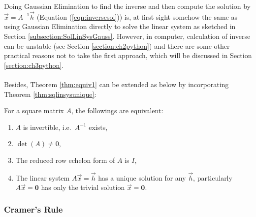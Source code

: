 Doing Gaussian Elimination to find the inverse and then compute the solution by $\vec{x} = A^{-1}\vec{h}$ (Equation (\ref{eqn:inversesol})) is, at first sight somehow the same as using Gaussian Elimination directly to solve the linear system as sketched in Section \ref{subsection:SolLinSysGauss}. However, in computer, calculation of inverse can be unstable (see Section \ref{section:ch2python}) and there are some other practical reasons not to take the first approach, which will be discussed in Section \ref{section:ch3python}. \\
\\
Besides, Theorem \ref{thm:equiv1} can be extended as below by incorporating Theorem \ref{thm:sqlinsysunique}:
\begin{thm}
\label{thm:equiv2}
For a square matrix $A$, the followings are equivalent:
\begin{enumerate}[label=(\alph*)]
\item $A$ is invertible, i.e.\ $A^{-1}$ exists,
\item $\det(A) \neq 0$,
\item The reduced row echelon form of $A$ is $I$,
\item The linear system $A\vec{x} = \vec{h}$ has a unique solution for any $\vec{h}$, particularly $A\vec{x} = \textbf{0}$ has only the trivial solution $\vec{x} = \textbf{0}$.
\end{enumerate}
\end{thm}

\subsubsection{Cramer's Rule}

